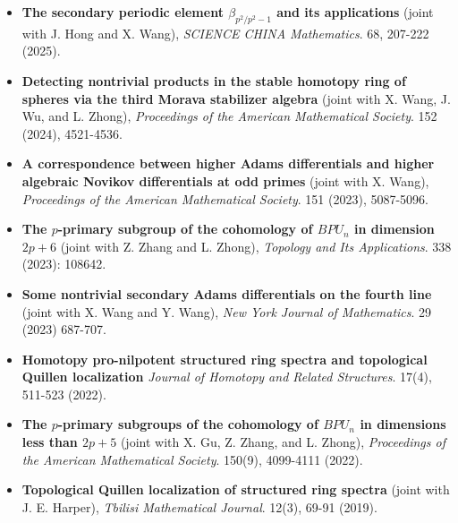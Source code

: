 \documentclass[12pt,a4paper,sans,fontset=windows]{moderncv} %
\begin{document}
\begin{itemize}[wide=30pt, leftmargin=*]
    \item \textbf{The secondary periodic element $\beta_{p^2/p^2-1}$ and its applications}
        \newline (joint with J. Hong and X. Wang), \textit{SCIENCE CHINA Mathematics}. 68, 207-222 (2025).
    \item \textbf{Detecting nontrivial products in the stable homotopy ring of spheres via the third Morava stabilizer algebra}
    \newline (joint with X. Wang, J. Wu, and L. Zhong), \textit{Proceedings of the American Mathematical Society}. 152 (2024), 4521-4536.
    \item \textbf{A correspondence between higher Adams differentials and higher algebraic Novikov differentials at odd primes}
        \newline (joint with X. Wang),  \textit{Proceedings of the American Mathematical Society}. 151 (2023), 5087-5096. 
    \item \textbf{The $p$-primary subgroup of the cohomology of $BPU_n$ in dimension $2p+6$}
        \newline (joint with Z. Zhang and L. Zhong), \textit{Topology and Its Applications}.  338 (2023): 108642.
    \item \textbf{Some nontrivial secondary Adams differentials on the fourth line}
        \newline (joint with X. Wang and Y. Wang),  \textit{New York Journal of Mathematics}.  29 (2023) 687-707.
    \item \textbf{Homotopy pro-nilpotent structured ring spectra and topological Quillen localization}
        \newline \textit{Journal of Homotopy and Related Structures}. 17(4), 511-523 (2022).
    \item \textbf{The $p$-primary subgroups of the cohomology of $BPU_n$ in dimensions less than $2p+5$}
        \newline (joint with X. Gu, Z. Zhang, and L. Zhong), \textit{Proceedings of the American Mathematical Society}. 150(9), 4099-4111 (2022). 
    \item \textbf{Topological Quillen localization of structured ring spectra}
        \newline (joint with J. E. Harper), \textit{Tbilisi Mathematical Journal}. 12(3), 69-91 (2019). 
\end{itemize}

\vspace{2pt} 
\end{document}
